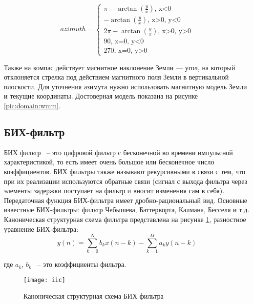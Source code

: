 \begin{equation}
    azimuth =
    \begin{cases}
      \pi - \arctan\left(\frac{y}{x}\right) \text{, x<0}\\      
      - \arctan\left(\frac{y}{x}\right) \text{, x>0, y<0} \\
      2\pi - \arctan\left(\frac{y}{x}\right) \text{, x>0, y>0} \\
      90 \text{, x=0, y<0} \\
      270 \text{, x=0, y>0}
    \end{cases}
\end{equation}

Также на компас действует магнитное наклонение Земли --- угол, на который отклоняется стрелка под действием 
магнитного поля Земли в вертикальной плоскости. Для уточнения азимута нужно использовать магнитную модель Земли
и текущие координаты.
Достоверная модель показана на рисунке \ref{pic:domain:wmm}.

\subsection{БИХ-фильтр}
БИХ фильтр ~-- это цифровой фильтр с
бесконечной во времени импульсной характеристикой, 
то есть имеет очень большое или бесконечное число коэффициентов. БИХ фильтры также 
называют рекурсивными в связи с тем, что при их
реализации используются обратные связи (сигнал с выхода фильтра через элементы задержки 
поступает на фильтр и вносит изменения сам в себя). 
Передаточная функция БИХ-фильтра имеет дробно-рациональный вид. Основные известные БИХ-фильтры: 
фильтр Чебышева, Баттерворта, Калмана, Бесселя и т.д.
Каноническая структурная схема фильтра представлена на рисунке \ref{pic:domain:iic}, разностное уравнение БИХ-фильтра:
\begin{equation}
    \label{eq:domain:eqIIC}
    y(n) = \sum_{k=0}^{N}b_{k}x(n-k) - \sum_{k=1}^{M}a_{k}y(n-k)
    \end{equation}
    \begin{explanationx}
        \item[где] $a_{k}$, $b_{k}$ ~-- это коэффициенты фильтра.
      \end{explanationx} 

      \begin{figure}[ht]
        \centering
        \texttt{[image: iic]}
        \caption{Каноническая структурная схема БИХ фильтра}
        \label{pic:domain:iic}
    \end{figure}
    
